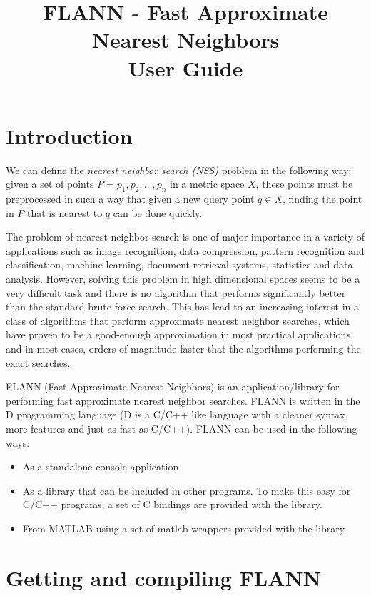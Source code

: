 \documentclass[letter,10pt]{article}
\title{FLANN - Fast Approximate Nearest Neighbors\\User Guide}
\date{}
\begin{document}
\maketitle



\section{Introduction}

We can define the \emph{nearest neighbor search (NSS)} problem in the following way: given a set of points $P=p_1,p_2,\dots,p_n$ in a metric space $X$, these points must be preprocessed in such a way that given a new query point $q \in X$, finding the point in $P$ that is nearest to $q$ can be done quickly.

The problem of nearest neighbor search is one of major importance in a variety of applications such as image recognition, data compression, pattern recognition and classification, machine learning,  document retrieval systems, statistics and data analysis. However, solving this problem in high dimensional spaces seems to be a very difficult task and there is no algorithm that performs significantly better than the standard brute-force search. This has lead to an increasing interest in a class of algorithms that perform approximate nearest neighbor searches, which have proven to be a good-enough approximation in most practical applications and in most cases, orders of magnitude faster that the algorithms performing the exact searches.

FLANN (Fast Approximate Nearest Neighbors) is an application/library for performing fast approximate nearest neighbor searches. FLANN is written in the D programming language (D is a C/C++ like language with a cleaner syntax, more features and just as fast as C/C++). FLANN can be used in the following ways:
\begin{itemize}
 \item As a standalone console application
\item As a library that can be included in other programs. To make this easy for C/C++ programs, a set of C bindings are provided with the library.
\item From MATLAB using a set of matlab wrappers provided with the library.
\end{itemize}


\section{Getting and compiling FLANN}
\end{document}
